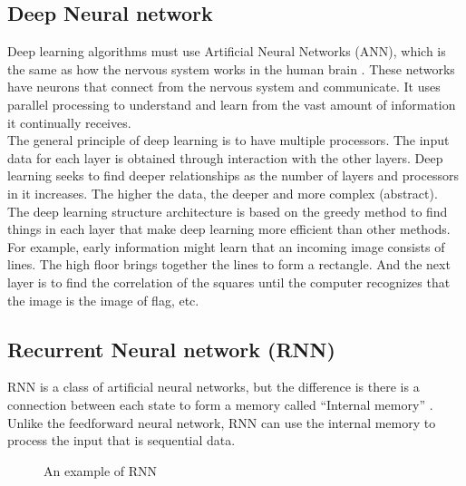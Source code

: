 \documentclass[12pt,oneside,openright,a4paper]{cpe-english-project}
\begin{document}
\subsection{Deep Neural network}
Deep learning algorithms must use Artificial Neural Networks (ANN), which is the same as how
the nervous system works in the human brain \cite{machine_learning_vs_deep_learning}. These networks have neurons that
connect from the nervous system and communicate. It uses parallel processing to understand and
learn from the vast amount of information it continually receives.\\
The general principle of deep learning is to have multiple processors. The input data for each
layer is obtained through interaction with the other layers. Deep learning seeks to find deeper
relationships as the number of layers and processors in it increases. The higher the data, the
deeper and more complex (abstract).\\
The deep learning structure architecture is based on the greedy method to find things in each
layer that make deep learning more efficient than other methods. For example, early information
might learn that an incoming image consists of lines. The high floor brings together the lines
to form a rectangle. And the next layer is to find the correlation of the squares until the
computer recognizes that the image is the image of flag, etc.

\subsection{Recurrent Neural network (RNN)}
RNN is a class of artificial neural networks, but the difference is there is a connection between
each state to form a memory called “Internal memory” \cite{understand_rnn}. Unlike the feedforward
neural network, RNN can use the internal memory to process the input that is sequential data.

\begin{figure}[!h] \centering
  \setlength{\fboxrule}{0.2mm} %
  \setlength{\fboxsep}{0.5cm} %
  \caption{An example of RNN} %
  \label{fig:example_rnn} %
\end{figure}
\end{document}

